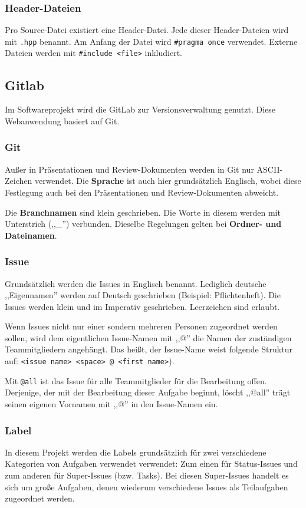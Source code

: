 \documentclass[../review_3.tex]{subfiles}
\begin{document}
\subsubsection{Header-Dateien}
Pro Source-Datei existiert eine Header-Datei. Jede dieser Header-Dateien wird mit \texttt{.hpp} benannt. Am Anfang der Datei wird \texttt{\#pragma once} verwendet. Externe Dateien werden mit \texttt{\#include <file>} inkludiert.

\subsection{Gitlab}
Im Softwareprojekt wird die GitLab zur Versionsverwaltung genutzt. Diese Webanwendung basiert auf Git.

\subsubsection{Git}
Außer in Präsentationen und Review-Dokumenten werden in Git nur ASCII-Zeichen verwendet. Die \textbf{Sprache} ist auch hier grundsätzlich Englisch, wobei diese Festlegung auch bei den Präsentationen und Review-Dokumenten abweicht.

Die \textbf{Branchnamen} sind klein geschrieben. Die Worte in diesem werden mit Unterstrich (,,\_'') verbunden. Dieselbe Regelungen gelten bei \textbf{Ordner- und Dateinamen}.

\subsubsection{Issue}
Grundsätzlich werden die Issues in Englisch benannt. Lediglich deutsche ,,Eigennamen'' werden auf Deutsch geschrieben (Beispiel: Pflichtenheft).
Die Issues werden klein und im Imperativ geschrieben. Leerzeichen sind erlaubt.

Wenn Issues nicht nur einer sondern mehreren Personen zugeordnet werden sollen, wird dem eigentlichen Issue-Namen mit ,,@'' die Namen der zuständigen Teammitgliedern angehängt. Das heißt, der Issue-Name weist folgende Struktur auf: \texttt{<issue name> <space> @ <first name>}).

Mit \texttt{@all} ist das Issue für alle Teammitglieder für die Bearbeitung offen. Derjenige, der mit der Bearbeitung dieser Aufgabe beginnt, löscht ,,@all'' trägt seinen eigenen Vornamen mit ,,@'' in den Issue-Namen ein.

\subsubsection{Label}
In diesem Projekt werden die Labels grundsätzlich für zwei verschiedene Kategorien von Aufgaben verwendet verwendet: Zum einen für Status-Issues und zum anderen für Super-Issues (bzw. Tasks). Bei diesen Super-Issues handelt es sich um große Aufgaben, denen wiederum verschiedene Issues als Teilaufgaben zugeordnet werden.
\end{document}

